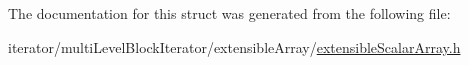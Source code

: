 The documentation for this struct was generated from the following file:\begin{DoxyCompactItemize}
\item 
iterator/multiLevelBlockIterator/extensibleArray/\hyperlink{extensibleScalarArray_8h}{extensibleScalarArray.h}\end{DoxyCompactItemize}
